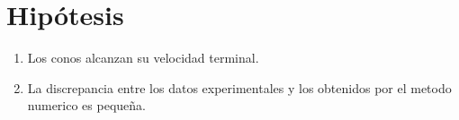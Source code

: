 \section{Hipótesis}

\begin{enumerate}
    \item Los conos alcanzan su velocidad terminal.
    \item La discrepancia entre los datos experimentales y 
        los obtenidos por el metodo numerico es pequeña.
\end{enumerate}
